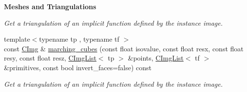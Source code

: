 \begin{Indent}{\bf Meshes and Triangulations}
\begin{DoxyCompactItemize}
\begin{DoxyCompactList}\small\item\em Get a triangulation of an implicit function defined by the instance image. \end{DoxyCompactList}\item 
{\footnotesize template$<$typename tp , typename tf $>$ }\\const \hyperlink{structcimg__library_1_1_c_img}{C\-Img} \& \hyperlink{structcimg__library_1_1_c_img_a01039be735452fbafd2527a461e4305e}{marching\-\_\-cubes} (const float isovalue, const float resx, const float resy, const float resz, \hyperlink{structcimg__library_1_1_c_img_list}{C\-Img\-List}$<$ tp $>$ \&points, \hyperlink{structcimg__library_1_1_c_img_list}{C\-Img\-List}$<$ tf $>$ \&primitives, const bool invert\-\_\-faces=false) const 
\begin{DoxyCompactList}\small\item\em Get a triangulation of an implicit function defined by the instance image. \end{DoxyCompactList}\end{DoxyCompactItemize}
\end{Indent}
